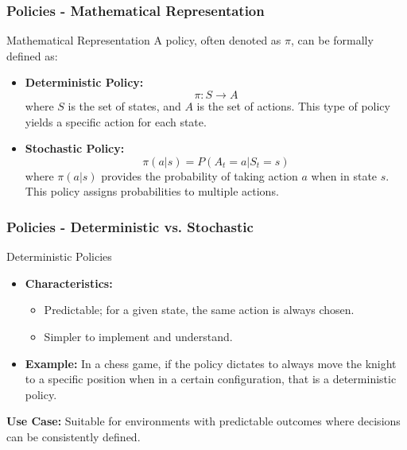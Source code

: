 \documentclass{beamer}
\begin{document}
\begin{frame}[fragile]
    \frametitle{Policies - Mathematical Representation}
    \begin{block}{Mathematical Representation}
        A policy, often denoted as \( \pi \), can be formally defined as:
        \begin{itemize}
            \item \textbf{Deterministic Policy:} 
                \[
                \pi: S \rightarrow A
                \]
                where \( S \) is the set of states, and \( A \) is the set of actions. This type of policy yields a specific action for each state.
                
            \item \textbf{Stochastic Policy:} 
                \[
                \pi(a|s) = P(A_t = a | S_t = s)
                \]
                where \( \pi(a|s) \) provides the probability of taking action \( a \) when in state \( s \). This policy assigns probabilities to multiple actions.
        \end{itemize}
    \end{block}
\end{frame}

\begin{frame}[fragile]
    \frametitle{Policies - Deterministic vs. Stochastic}
    \begin{block}{Deterministic Policies}
        \begin{itemize}
            \item \textbf{Characteristics:}
                \begin{itemize}
                    \item Predictable; for a given state, the same action is always chosen.
                    \item Simpler to implement and understand.
                \end{itemize}
            \item \textbf{Example:} In a chess game, if the policy dictates to always move the knight to a specific position when in a certain configuration, that is a deterministic policy.
        \end{itemize}
        
        \textbf{Use Case:} Suitable for environments with predictable outcomes where decisions can be consistently defined.
    \end{block}
\end{frame}
\end{document}

